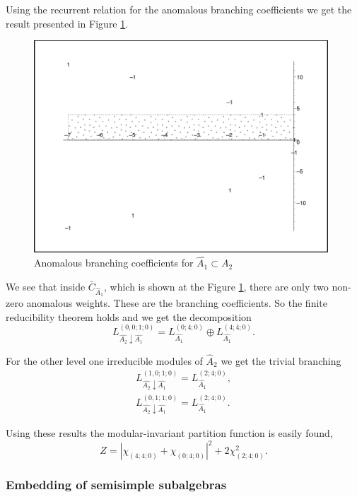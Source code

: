 \documentclass[a4paper,12pt]{article}
\theoremstyle{definition} \newtheorem{Def}{Definition}
\begin{document}
Using the recurrent relation for the anomalous branching coefficients we get the result presented in Figure \ref{fig:AffineA2_A1_branching}. 
\begin{figure}[h!tb]
  \centering
  \includegraphics[width=110mm]{AffineA2_A1_branching.pdf}
  \caption{Anomalous branching coefficients for $\hat{A_1}\subset \hat{A_2}$}
  \label{fig:AffineA2_A1_branching}
\end{figure}

We see that inside $\bar{C}_{\hat{A}_1}$, which is shown at the Figure \ref{fig:AffineA2_A1_branching}, there are only two non-zero anomalous weights. These are the branching coefficients. So the finite reducibility theorem holds and we get the decomposition
\begin{equation}
  \label{eq:43}
  L^{(0,0;1;0)}_{\hat{A_2}\downarrow \hat{A_1}}= L_{\hat{A_1}}^{(0;4;0)}\oplus L_{\hat{A_1}}^{(4;4;0)}.
\end{equation}

For the other level one irreducible modules of $\hat{A}_2$ we get the trivial
branching 
\begin{eqnarray}
  \label{eq:44}
   L^{(1,0;1;0)}_{\hat{A_2}\downarrow \hat{A_1}}= L_{\hat{A_1}}^{(2;4;0)},\\
   L^{(0,1;1;0)}_{\hat{A_2}\downarrow \hat{A_1}}= L_{\hat{A_1}}^{(2;4;0)}.
\end{eqnarray}

Using these results the modular-invariant partition function is easily found,
\begin{equation}
  \label{eq:45}
  Z=\left|\chi_{(4;4;0)}+\chi_{(0;4;0)}\right|^2+2\chi_{(2;4;0)}^2.
\end{equation}

\subsubsection{Embedding of semisimple subalgebras}
\label{sec:embedd-semis-subalg}
\end{document}
